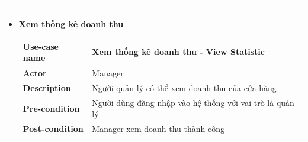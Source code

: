 \begin {list} {-}{}
\begin{itemize}
\begin{table}[H]
\begin{tabular}{|l|l|}
            \end{tabular}
            \begin{center}
            \end{center}
            \caption{Đặc tả use case quản lý người dùng}
            \label{table:user-manager}
            \end{table}
            \item \textbf{Xem thống kê doanh thu}
            \begin{table}[H]
                \begin{tabular}{|l|l|}
                \hline
                \textbf{Use-case name}    & \textbf{Xem thống kê doanh thu - View Statistic}                                                                                                                                                                                                                                                                                                                                 \\ \hline
                \textbf{Actor}            & Manager                                                                                                                                                                                                                                                                                                                                                                          \\ \hline
                \textbf{Description}      & Người quản lý có thể xem doanh thu của cửa hàng                                                                                                                                                                                                                                                                                                                                  \\ \hline
                \textbf{Pre-condition}    & Người dùng đăng nhập vào hệ thống với vai trò là quản lý                                                                                                                                                                                                                                                                                                                         \\ \hline
                \textbf{Post-condition}   & Manager xem doanh thu thành công                                                                                                                                                                                                                                                                                                                                                 \\ \hline

\end{tabular}
\end{table}
\end{itemize}
\end{list}
